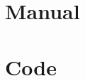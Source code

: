\documentclass[12pt,twosided]{report}
\begin{document}
\begin{appendices}


  
%

\chapter{Manual}
\label{appendix:manual}


%

\chapter{Code}
\label{appendix:code}

\end{appendices}

\printbibliography[heading=bibintoc,title={References}]
\end{document}
